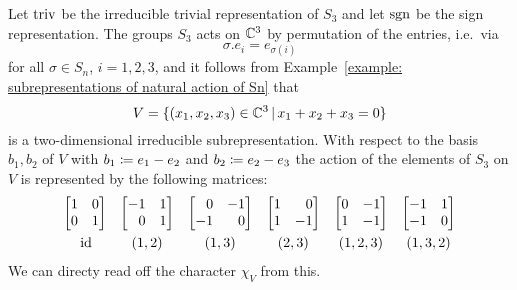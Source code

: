 \begin{example}
  \label{example: character table S3}
  Let $\operatorname{triv}$ be the irreducible trivial representation of $S_3$ and let $\operatorname{sgn}$ be the sign representation.
  The groups $S_3$ acts on $\mathbb{C}^3$ by permutation of the entries, i.e.\ via
  \[
      \sigma.e_i
    = e_{\sigma(i)}
  \]
  for all $\sigma \in S_n$, $i = 1, 2, 3$, and it follows from Example~\ref{example: subrepresentations of natural action of Sn} that
  \[
        V
    = \{
        (x_1, x_2, x_3) \in \Complex^3
      \suchthat
        x_1 + x_2 + x_3 = 0
      \}
  \]
  is a two-dimensional irreducible subrepresentation.
  With respect to the basis $b_1, b_2$ of $V$ with $b_1 \coloneqq e_1 - e_2$ and $b_2 \coloneqq e_2 - e_3$ the action of the elements of $S_3$ on $V$ is represented by the following matrices:
  \begin{equation}
    \label{equation: representing matrix for 2dim irrep of S3}
    \begin{array}{cccccc}
        \begin{bmatrix*}[r]
          1 & 0 \\
          0 & 1
        \end{bmatrix*}
      & \begin{bmatrix*}[r]
          -1  & 1 \\
           0  & 1
        \end{bmatrix*}
      & \begin{bmatrix*}[r]
           0  & -1  \\
          -1  &  0
        \end{bmatrix*}
      & \begin{bmatrix*}[r]
          1 &  0 \\
          1 & -1
        \end{bmatrix*}
      & \begin{bmatrix*}[r]
          0 & -1 \\
          1 & -1
        \end{bmatrix*}
      & \begin{bmatrix*}[r]
          -1  & 1 \\
          -1  & 0
        \end{bmatrix*}
      \\
        \rule{0pt}{1.2em}
        \id
      & (1,2)
      & (1,3)
      & (2,3)
      & (1,2,3)
      & (1,3,2)
    \end{array}
  \end{equation}
  We can directy read off the character $\chi_V$ from this.

\end{example}
